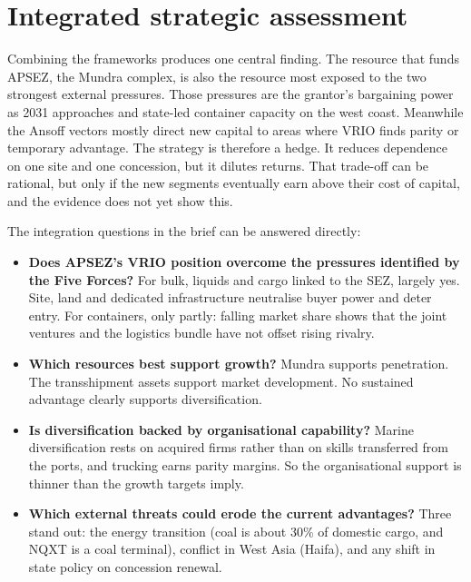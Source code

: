 \documentclass[12pt, a4paper]{article}
\begin{document}
\section{Integrated strategic assessment}\label{sec:integration}
Combining the frameworks produces one central finding. The resource that funds
APSEZ, the Mundra complex, is also the resource most exposed to the two
strongest external pressures. Those pressures are the grantor's bargaining power
as 2031 approaches and state-led container capacity on the west coast.
Meanwhile the Ansoff vectors mostly direct new capital to areas where VRIO finds
parity or temporary advantage. The strategy is therefore a hedge. It reduces
dependence on one site and one concession, but it dilutes returns. That
trade-off can be rational, but only if the new segments eventually earn above
their cost of capital, and the evidence does not yet show this.

The integration questions in the brief can be answered directly:
\begin{itemize}
  \item \textbf{Does APSEZ's VRIO position overcome the pressures identified by
        the Five Forces?} For bulk, liquids and cargo linked to the SEZ, largely
        yes. Site, land and dedicated infrastructure neutralise buyer power and
        deter entry. For containers, only partly: falling market share shows
        that the joint ventures and the logistics bundle have not offset rising
        rivalry.
  \item \textbf{Which resources best support growth?} Mundra supports
        penetration. The transshipment assets support market development. No
        sustained advantage clearly supports diversification.
  \item \textbf{Is diversification backed by organisational capability?} Marine
        diversification rests on acquired firms rather than on skills
        transferred from the ports, and trucking earns parity margins. So the
        organisational support is thinner than the growth targets imply.
  \item \textbf{Which external threats could erode the current advantages?}
        Three stand out: the energy transition (coal is about 30\% of domestic
        cargo, and NQXT is a coal terminal), conflict in West Asia (Haifa), and
        any shift in state policy on concession renewal.
\end{itemize}
\end{document}
